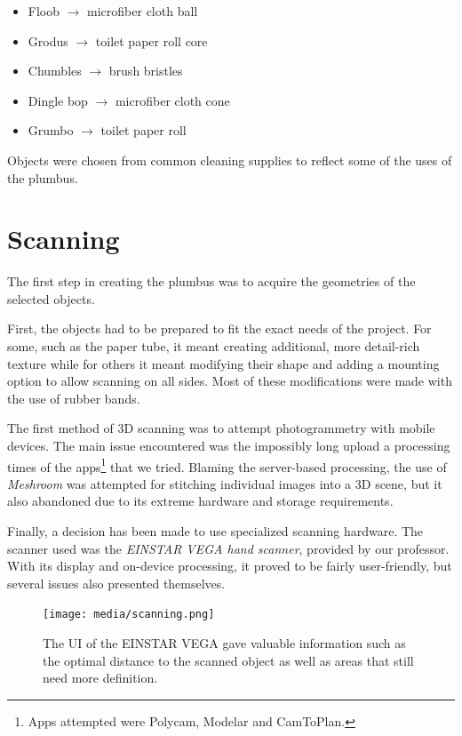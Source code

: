 \documentclass[12pt,a4paper]{article}
\begin{document}
\begin{itemize}
  \item Floob $\to$ microfiber cloth ball
  \item Grodus $\to$ toilet paper roll core
  \item Chumbles $\to$ brush bristles
  \item Dingle bop $\to$ microfiber cloth cone
  \item Grumbo $\to$ toilet paper roll
\end{itemize}

Objects were chosen from common cleaning supplies to reflect some of the uses of
the plumbus.

\section{Scanning}

The first step in creating the plumbus was to acquire the geometries of the
selected objects.

First, the objects had to be prepared to fit the exact needs of the project. For
some, such as the paper tube, it meant creating additional, more detail-rich
texture while for others it meant modifying their shape and adding a mounting
option to allow scanning on all sides. Most of these modifications were made
with the use of rubber bands.

The first method of 3D scanning was to attempt photogrammetry
with mobile devices. The main issue encountered was the impossibly long upload a
processing times of the apps\footnote{Apps attempted were Polycam, Modelar and
CamToPlan.} that we tried. Blaming the server-based processing, the use of
\emph{Meshroom} was attempted for stitching individual images into a 3D scene,
but it also abandoned due to its extreme hardware and storage requirements.

Finally, a decision has been made to use specialized scanning hardware.
The scanner used was the \emph{EINSTAR VEGA hand scanner},
provided by our professor. With its display and on-device processing, it proved
to be fairly user-friendly, but several issues also presented themselves.

\begin{figure}[h]
  \centering
  \texttt{[image: media/scanning.png]}
  \caption{The UI of the EINSTAR VEGA gave valuable information such as the
    optimal distance to the scanned object as well as areas that still need more
  definition.}
\end{figure}
\end{document}

